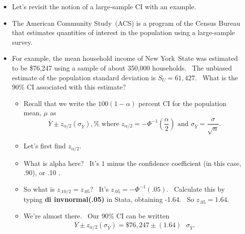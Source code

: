 \documentclass[11pt]{article}
\begin{document}
\begin{itemize}
\item Let's revisit the notion of a large-sample CI with an example.

\item The American Community Study\ (ACS) is a program of the Census Bureau
that estimates quantities of interest in the population using a large-sample
survey.

\item For example, the mean household income of New York\ State was
estimated to be \$76,247 using a sample of about 350,000 households. \ The
unbiased estimate of the population standard deviation is $S_{U}=61,427.$ \
What is the 90\% CI associated with this estimate?

\begin{itemize}
\item Recall that we write the $100\left( 1-\alpha \right) $ percent CI for
the population mean, $\mu $ as%
\begin{equation*}
\overline{Y}\pm z_{\alpha /2}\left( \sigma _{\overline{Y}}\right) ,\text{%
where }z_{\alpha /2}=-\Phi ^{-1}\left( \frac{\alpha }{2}\right) \text{ and }%
\sigma _{\overline{Y}}=\frac{\sigma }{\sqrt{n}}.
\end{equation*}

\item Let's first find $z_{\alpha /2}.$

\item What is alpha here? \ It's $1$ minus the confidence coefficient (in
this case, .90), or .10 .

\item So what is $z_{.10/2}=z_{.05}$? \ It's $z_{.05}=-\Phi ^{-1}\left(
.05\right) .$ \ Calculate this by typing \textbf{di invnormal(.05)} in
Stata, obtaining -1.64. \ So $z_{.05}=1.64.$

\item We're almost there. \ Our 90\% CI can be written%
\begin{equation*}
\overline{Y}\pm z_{\alpha /2}\left( \sigma _{\overline{Y}}\right)
=\$76,247\pm \left( 1.64\right) \text{ }\sigma _{\overline{Y}}.
\end{equation*}


\end{itemize}
\end{itemize}
\end{document}
